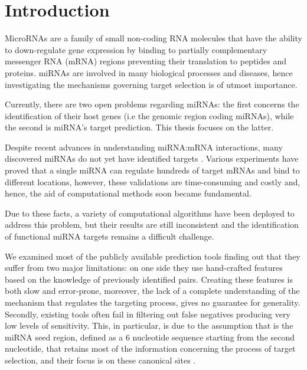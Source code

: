 
\chapter{Introduction} %

\label{Intro} %


\newcommand{\keyword}[1]{\textbf{#1}}
\newcommand{\tabhead}[1]{\textbf{#1}}
\newcommand{\code}[1]{\texttt{#1}}
\newcommand{\file}[1]{\texttt{\bfseries#1}}
\newcommand{\option}[1]{\texttt{\itshape#1}}

MicroRNAs are a family of small non-coding RNA molecules that have the ability to  down-regulate gene expression by binding to partially complementary messenger RNA (mRNA) regions preventing their translation to peptides and proteins. miRNAs are involved in many biological processes and diseases, hence investigating the mechanisms governing target selection is of utmost importance. 

Currently, there are two open problems regarding miRNAs: the first concerns the identification of their host genes (i.e the genomic region coding miRNAs), while the second is miRNA's target prediction. This thesis focuses on the latter.

Despite recent advances in understanding miRNA:mRNA interactions, many discovered miRNAs do not yet have identified targets \cite{perfect_matching}. Various experiments have proved that a single miRNA can regulate hundreds of target mRNAs and bind to different locations, however, these validations are time-consuming and costly and, hence, the aid of computational methods soon became fundamental.

Due to these facts, a variety of computational algorithms have been deployed to address this problem, but their results are still inconsistent and the identification of functional miRNA targets remains a difficult challenge.

We examined most of the publicly available prediction tools finding out that they suffer from two major limitations: on one side they use hand-crafted features based on the knowledge of previously identified pairs. Creating these features is both slow and error-prone, moreover, the lack of a complete understanding of the mechanism that regulates the targeting process, gives no guarantee for generality. Secondly, existing tools often fail in filtering out false negatives producing very low levels of sensitivity. This, in particular, is due to the assumption that is the miRNA seed region, defined as a 6 nucleotide sequence starting from the second nucleotide, that retains most of the information concerning the process of target selection, and their focus is on these canonical sites \cite{canonical_target}.    


